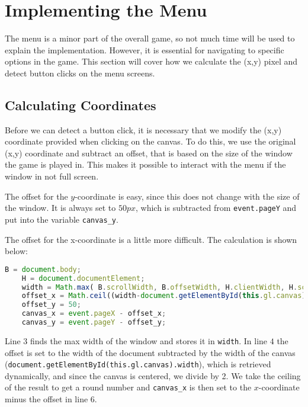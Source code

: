 \section{Implementing the Menu}
\label{sec:imp_menu}

The menu is a minor part of the overall game, so not much time will be used to explain the implementation. However, it is essential for navigating to specific options in the game. This section will cover how we calculate the (x,y) pixel and detect button clicks on the menu screens.

\subsection{Calculating Coordinates}

Before we can detect a button click, it is necessary that we modify the (x,y) coordinate provided when clicking on the canvas. To do this, we use the original (x,y) coordinate and subtract an offset, that is based on the size of the window the game is played in. This makes it possible to interact with the menu if the window in not full screen.

The offset for the $y$-coordinate is easy, since this does not change with the size of the window. It is always set to $50px$, which is subtracted from \verb|event.pageY| and put into the variable \verb|canvas_y|.\newline

The offset for the x-coordinate is a little more difficult. The calculation is shown below:

\begin{lstlisting}[language=JavaScript, caption=doMouseDown(event)]
	B = document.body;
	H = document.documentElement;
	width = Math.max( B.scrollWidth, B.offsetWidth, H.clientWidth, H.scrollWidth, H.offsetWidth);
	offset_x = Math.ceil((width-document.getElementById(this.gl.canvas).width)/2);
	offset_y = 50;
	canvas_x = event.pageX - offset_x;
	canvas_y = event.pageY - offset_y;
\end{lstlisting}
 
Line $3$ finds the max width of the window and stores it in \verb|width|. In line $4$ the offset is set to the width of the document subtracted by the width of the canvas (\verb|document.getElementById(this.gl.canvas).width|), which is retrieved dynamically, and since the canvas is centered, we divide by 2. We take the ceiling of the result to get a round number and \verb|canvas_x| is then set to the $x$-coordinate minus the offset in line $6$.

